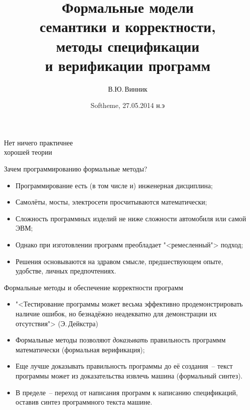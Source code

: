 \documentclass[landscape]{slides}
\begin{document}
\author{В.Ю.\,Винник}

\title{%
Формальные модели\\%
семантики и корректности,\\%
методы спецификации\\%
и верификации программ}

\date{Softheme, 27.05.2014 н.э}

\maketitle

\begin{slide}
\begin{center}
\begin{LARGE}
Нет ничего практичнее\\%
хорошей теории
\end{LARGE}
\end{center}
\end{slide}

\begin{slide}
Зачем программированию формальные методы?
\begin{itemize}
\item Программирование есть (в том числе и) инженерная дисциплина;
\item Самолёты, мосты, электросети просчитываются математически;
\item Сложность программных изделий не ниже сложности автомобиля
        или самой ЭВМ;
\item Однако при изготовлении программ преобладает "<ремесленный">
        подход;
\item Решения основываются на здравом смысле, предшествующем опыте,
        удобстве, личных предпочтениях.
\end{itemize}
\end{slide}

\begin{slide}
Формальные методы и обеспечение корректности программ
\begin{itemize}
\item "<Тестирование программы может весьма эффективно продемонстрировать
        наличие ошибок, но безнадёжно неадекватно для демонстрации их
        отсутствия"> (Э.\,Дейкстра)
\item Формальные методы позволяют \emph{доказывать} правильность программм
        математически (формальная верификация);
\item Еще лучше доказывать правильность программы до её создания~-- текст
        программы может из доказательства извлечь машина (формальный синтез).
\item В пределе~-- переход от написания программ к написанию спецификаций,
        оставив синтез программного текста машине.
\end{itemize}
\end{slide}
\end{document}
